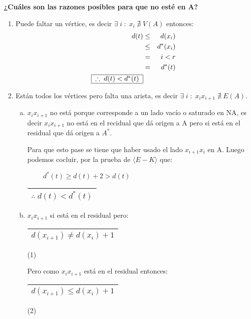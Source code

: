 \documentclass[12pt,a4paper]{report}
\newcounter{neq}
\begin{document}
		\textbf{¿Cuáles son las razones posibles para que no esté en A?}
		\begin{enumerate}
			\item Puede faltar un vértice, es decir $\exists \; i \; : \; x_{i} \; \nexists \; V(A)$ entonces:
			\begin{eqnarray}
				\nonumber d(t) & \leq & d(x_{i}) \\
				\nonumber & \leq & d^{*}(x_{i}) \\
				\nonumber & = & i < r \\
				\nonumber & = & d^{*}(t) \\
				\nonumber \begin{tabular}{|c|} \hline $\therefore \; d(t) < d^{*}(t)$ \\ \hline \end{tabular}
			\end{eqnarray}
			
			\item Están todos los vértices pero falta una arista, es decir $\exists \; i \; : \; x_{i}x_{i+1} \; \nexists \; E(A)$.
			\begin{enumerate}[a)]
				\item $x_{i}x_{i+1}$ no está porque corresponde a un lado vacío o saturado en NA, es decir $x_{i}x_{i+1}$ no está en el recidual que dá origen a A pero si está en el residual que dá origen a $A^{*}$.
				
				Para que esto pase se tiene que haber usado el lado $x_{i+1}x_{i}$ en A. Luego podemos cocluir, por la prueba de $\langle E-K \rangle$ que:
				\begin{center}
					$\qquad \; d^{*}(t) \geq d(t) + 2 > d(t) $
					
					\vspace{2mm}
					\begin{tabular}{|c|} \hline $\therefore \; d(t) < d^{*}(t)$ \\ \hline \end{tabular}
				\end{center}
				
				\item $x_{i}x_{i+1}$ si está en el residual pero:
				\begin{tabular}{|c|} \hline $d(x_{i+1}) \neq d(x_{i}) +1 $ \\ \hline \end{tabular} (1)
				
				\vspace{5mm}
				Pero como $x_{i}x_{i+1}$ está en el residual entonces:
				\begin{tabular}{|c|} \hline $d(x_{i+1}) \leq d(x_{i}) +1 $ \\ \hline \end{tabular} (2)
				

\end{enumerate}
\end{enumerate}
\end{document}
